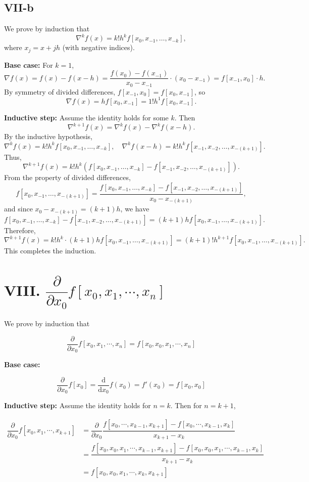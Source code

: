 \documentclass[a4paper]{article}
\begin{document}
\subsection*{VII-b}

We prove by induction that
\[
\nabla^k f(x) = k! h^k f[x_0, x_{-1}, \ldots, x_{-k}],
\]
where \( x_j = x + jh \) (with negative indices).

\textbf{Base case:} For \( k = 1 \),
\[
\nabla f(x) = f(x) - f(x-h) = \frac{f(x_0) - f(x_{-1})}{x_0 - x_{-1}} \cdot (x_0 - x_{-1}) = f[x_{-1}, x_0] \cdot h.
\]
By symmetry of divided differences, \( f[x_{-1}, x_0] = f[x_0, x_{-1}] \), so
\[
\nabla f(x) = h f[x_0, x_{-1}] = 1! h^1 f[x_0, x_{-1}].
\]

\textbf{Inductive step:} Assume the identity holds for some \( k \). Then
\[
\nabla^{k+1} f(x) = \nabla^k f(x) - \nabla^k f(x-h).
\]
By the inductive hypothesis,
\[
\nabla^k f(x) = k! h^k f[x_0, x_{-1}, \ldots, x_{-k}], \quad \nabla^k f(x-h) = k! h^k f[x_{-1}, x_{-2}, \ldots, x_{-(k+1)}].
\]
Thus,
\[
\nabla^{k+1} f(x) = k! h^k \left( f[x_0, x_{-1}, \ldots, x_{-k}] - f[x_{-1}, x_{-2}, \ldots, x_{-(k+1)}] \right).
\]
From the property of divided differences,
\[
f[x_0, x_{-1}, \ldots, x_{-(k+1)}] = \frac{f[x_0, x_{-1}, \ldots, x_{-k}] - f[x_{-1}, x_{-2}, \ldots, x_{-(k+1)}]}{x_0 - x_{-(k+1)}},
\]
and since \( x_0 - x_{-(k+1)} = (k+1)h \), we have
\[
f[x_0, x_{-1}, \ldots, x_{-k}] - f[x_{-1}, x_{-2}, \ldots, x_{-(k+1)}] = (k+1)h f[x_0, x_{-1}, \ldots, x_{-(k+1)}].
\]
Therefore,
\[
\nabla^{k+1} f(x) = k! h^k \cdot (k+1)h f[x_0, x_{-1}, \ldots, x_{-(k+1)}] = (k+1)! h^{k+1} f[x_0, x_{-1}, \ldots, x_{-(k+1)}].
\]
This completes the induction.

\section*{VIII. $\dfrac\partial{\partial x_0}f[x_0, x_1, \cdots, x_n]$}

We prove by induction that

$$\dfrac\partial{\partial x_0}f[x_0, x_1, \cdots, x_n] = f[x_0, x_0, x_1, \cdots, x_n]$$

\textbf{Base case:}

$$\dfrac\partial{\partial x_0}f[x_0] = \dfrac{\mathrm{d}} {\mathrm{d}  x_0}f(x_0) = f'(x_0) = f[x_0, x_0]$$

\textbf{Inductive step:} Assume the identity holds for $n = k$. Then for $n = k+1$,

\begin{align*}
\dfrac\partial{\partial x_0}f[x_0, x_1, \cdots, x_{k+1}] &= \dfrac\partial{\partial x_0}\dfrac{f[x_0, \cdots, x_{k-1}, x_{k+1}] - f[x_0, \cdots, x_{k-1}, x_{k}]}{x_{k+1} - x_k}\\
&= \dfrac{f[x_0, x_0, x_1, \cdots, x_{k-1}, x_{k+1}] - f[x_0, x_0, x_1, \cdots, x_{k-1}, x_{k}]}{x_{k+1} - x_k}\\
&= f[x_0, x_0, x_1, \cdots, x_k, x_{k+1}]
\end{align*}
\end{document}
